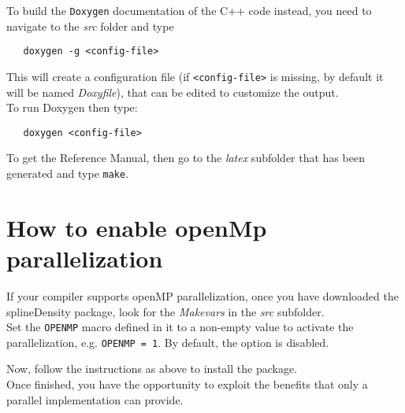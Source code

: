To build the \verb|Doxygen| documentation of the C++ code instead, you need to navigate to the \textit{src} folder and type 
\begin{verbatim}
   doxygen -g <config-file>
\end{verbatim}
This will create a configuration file (if \verb|<config-file>| is missing, by default it will be named \textit{Doxyfile}), that can be edited to customize the output. \\
To run Doxygen then type:
\begin{verbatim}
   doxygen <config-file>
\end{verbatim}
To get the Reference Manual, then go to the \textit{latex} subfolder that has been generated and type \verb|make|.




\section{How to enable openMp parallelization}
If your compiler supports openMP parallelization, once you have downloaded the splineDensity package, look for the \textit{Makevars} in the \textit{src} subfolder.\\
Set the \verb|OPENMP| macro defined in it to a non-empty value to activate the parallelization, e.g. \verb|OPENMP = 1|. By default, the option is disabled.

Now, follow the instructions as above to install the package. \\
Once finished, you have the opportunity to exploit the benefits that only a parallel implementation can provide.
